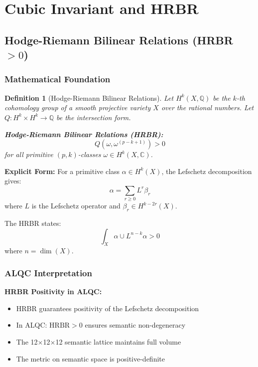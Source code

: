 \documentclass[11pt, letterpaper]{article}
\newtheorem{definition}[theorem]{Definition}
\begin{document}
\section{Cubic Invariant and HRBR}

\subsection{\texorpdfstring{Hodge-Riemann Bilinear Relations (HRBR $> 0$)}{Hodge-Riemann Bilinear Relations (HRBR > 0)}}

\subsubsection{Mathematical Foundation}

\begin{definition}[Hodge-Riemann Bilinear Relations]
Let $H^k(X, \mathbb{Q})$ be the $k$-th cohomology group of a smooth projective variety $X$ over the rational numbers. Let $Q: H^k \times H^k \rightarrow \mathbb{Q}$ be the intersection form.

\textbf{Hodge-Riemann Bilinear Relations (HRBR):}
\begin{equation}
Q(\omega, \omega^{(p-k+1)}) > 0
\end{equation}
for all primitive $(p,k)$-classes $\omega \in H^k(X, \mathbb{C})$.
\end{definition}

\textbf{Explicit Form:}
For a primitive class $\alpha \in H^k(X)$, the Lefschetz decomposition gives:
\begin{equation}
\alpha = \sum_{r \geq 0} L^r \beta_r
\end{equation}
where $L$ is the Lefschetz operator and $\beta_r \in H^{k-2r}(X)$.

The HRBR states:
\begin{equation}
\int_X \alpha \cup L^{n-k} \alpha > 0
\end{equation}
where $n = \dim(X)$.

\subsubsection{ALQC Interpretation}

\textbf{HRBR Positivity in ALQC:}
\begin{itemize}
    \item HRBR guarantees positivity of the Lefschetz decomposition
    \item In ALQC: $\text{HRBR} > 0$ ensures semantic non-degeneracy
    \item The 12$\times$12$\times$12 semantic lattice maintains full volume
    \item The metric on semantic space is positive-definite
\end{itemize}
\end{document}
